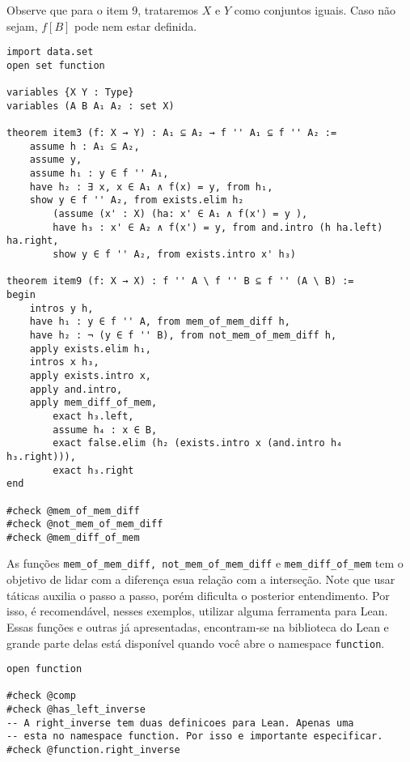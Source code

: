 Observe que para o item 9, trataremos $X$ e $Y$ como conjuntos iguais. Caso não sejam,
$f[B]$ pode nem estar definida.

\begin{lstlisting}
import data.set
open set function

variables {X Y : Type}
variables (A B A₁ A₂ : set X)

theorem item3 (f: X → Y) : A₁ ⊆ A₂ → f '' A₁ ⊆ f '' A₂ :=
    assume h : A₁ ⊆ A₂,
    assume y,
    assume h₁ : y ∈ f '' A₁,
    have h₂ : ∃ x, x ∈ A₁ ∧ f(x) = y, from h₁,
    show y ∈ f '' A₂, from exists.elim h₂
        (assume (x' : X) (ha: x' ∈ A₁ ∧ f(x') = y ),
        have h₃ : x' ∈ A₂ ∧ f(x') = y, from and.intro (h ha.left)  ha.right,
        show y ∈ f '' A₂, from exists.intro x' h₃)

theorem item9 (f: X → X) : f '' A \ f '' B ⊆ f '' (A \ B) :=
begin
    intros y h,
    have h₁ : y ∈ f '' A, from mem_of_mem_diff h,
    have h₂ : ¬ (y ∈ f '' B), from not_mem_of_mem_diff h,
    apply exists.elim h₁,
    intros x h₃,
    apply exists.intro x,
    apply and.intro,
    apply mem_diff_of_mem,
        exact h₃.left,
        assume h₄ : x ∈ B,
        exact false.elim (h₂ (exists.intro x (and.intro h₄ h₃.right))),
        exact h₃.right
end

#check @mem_of_mem_diff
#check @not_mem_of_mem_diff
#check @mem_diff_of_mem

\end{lstlisting}

As funções \lstinline{mem_of_mem_diff, not_mem_of_mem_diff} e \lstinline{mem_diff_of_mem}
tem o objetivo de lidar com a diferença esua relação com a interseção. Note que usar táticas
auxilia o passo a passo, porém dificulta o posterior entendimento. Por isso, é recomendável,
nesses exemplos, utilizar alguma ferramenta para Lean. 
Essas funções e outras já apresentadas, encontram-se na biblioteca do Lean e grande parte delas está 
disponível quando você abre o namespace \lstinline{function}.

\begin{lstlisting}
open function 

#check @comp 
#check @has_left_inverse
-- A right_inverse tem duas definicoes para Lean. Apenas uma
-- esta no namespace function. Por isso e importante especificar. 
#check @function.right_inverse    
\end{lstlisting}